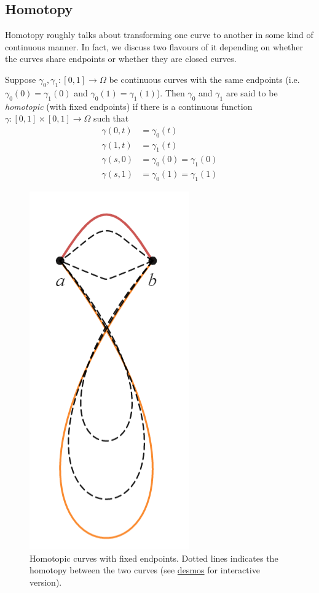 \subsection{Homotopy}
Homotopy roughly talks about transforming one curve to another in some kind of continuous manner. In fact, we discuss two flavours of it depending on whether the curves share endpoints or whether they are closed curves.

\begin{definition}
Suppose $\gamma_0, \gamma_1: [0, 1] \to \Omega$ be continuous curves with the same endpoints (i.e. $\gamma_0(0) = \gamma_1(0)$ and $\gamma_0(1) = \gamma_1(1)$). Then $\gamma_0$ and $\gamma_1$ are said to be \textit{homotopic} (with fixed endpoints) if there is a continuous function $\gamma: [0, 1] \times [0, 1] \to \Omega$ such that
\begin{align*}
    \gamma(0, t) &= \gamma_0(t)\\
    \gamma(1, t) &= \gamma_1(t)\\
    \gamma(s, 0) &= \gamma_0(0) = \gamma_1(0)\\
    \gamma(s, 1) &= \gamma_0(1) = \gamma_1(1)
\end{align*}
\end{definition}
\begin{figure}[h]
    \centering
    \includegraphics[scale=0.8]{Images/homotopy_example.png}
    \caption{Homotopic curves with fixed endpoints. Dotted lines indicates the homotopy between the two curves (see \href{https://www.desmos.com/calculator/jsdrzz6v0d}{desmos} for interactive version).}
    \label{fig:homotopic-fixed-ends}
\end{figure}


